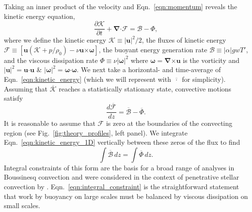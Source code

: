 \documentclass[twocolumn]{aastex631}
\renewcommand{\vec}[1]{\boldsymbol{#1}}
\renewcommand{\dot}{\vec{\cdot}}
\renewcommand{\bar}[1]{\overline{#1}}
\newcommand{\grad}{\vec{\nabla}}
\newcommand{\cross}{\vec{\times}}
\begin{document}
Taking an inner product of the velocity and Eqn.~\ref{eqn:momentum} reveals the kinetic energy equation,
\begin{equation}
\frac{\partial \mathcal{K}}{\partial t}
+ \grad\dot\mathcal{F}
= \mathcal{B} - \Phi,
\label{eqn:kinetic_energy}
\end{equation}
where we define the kinetic energy $\mathcal{K} \equiv |\vec{u}|^2/2$, the fluxes of kinetic energy $\mathcal{F} \equiv \left[\vec{u}(\mathcal{K} + p/\rho_0) - \nu\vec{u}\cross\vec{\omega} \right]$, the buoyant energy generation rate $\mathcal{B} \equiv |\alpha| g w T'$, and the viscous dissipation rate $\Phi \equiv \nu |\vec{\omega}|^2$ where $\vec{\omega} = \grad\cross\vec{u}$ is the vorticity and $|\vec{u}|^2 = \vec{u}\dot\vec{u}$ \& $|\vec{\omega}|^2 = \vec{\omega}\dot\vec{\omega}$.
We next take a horizontal- and time-average of Eqn.~\ref{eqn:kinetic_energy} (which we will represent with $\bar{\,\cdot\,}$ for simplicity).
Assuming that $\bar{\mathcal{K}}$ reaches a statistically stationary state, convective motions satisfy
\begin{equation}
\frac{d\bar{\mathcal{F}}}{dz} = \bar{\mathcal{B}} - \bar{\Phi}.
\label{eqn:kinetic_energy_1D}
\end{equation}
It is reasonable to assume that $\mathcal{F}$ is zero at the boundaries of the convecting region (see Fig.~\ref{fig:theory_profiles}, left panel).
We integrate Eqn.~\ref{eqn:kinetic_energy_1D} vertically between these zeros of the flux to find
\begin{equation}
\int \bar{\mathcal{B}}\,dz = \int \bar{\Phi}\,dz.
\label{eqn:integral_constraint}
\end{equation}
Integral constraints of this form are the basis for a broad range of analyses in Boussinesq convection \citep[see e.g.,][]{ahlers_etal_2009, goluskin2016} and were considered in the context of penetrative stellar convection by \citet{roxburgh1989}.
Eqn.~\ref{eqn:integral_constraint} is the straightforward statement that work by buoyancy on large scales must be balanced by viscous dissipation on small scales.
\end{document}
